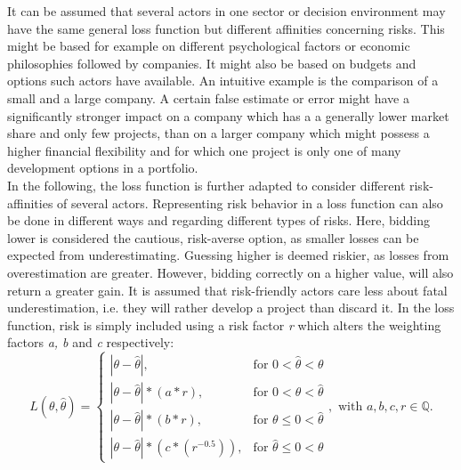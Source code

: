 		It can be assumed that several actors in one sector or decision environment may have the same general loss function but different affinities concerning risks. This might be based for example on different psychological factors or economic philosophies followed by companies. It might also be based on budgets and options such actors have available. An intuitive example is the comparison of a small and a large company. A certain false estimate or error might have a significantly stronger impact on a company which has a a generally lower market share and only few projects, than on a larger company which might possess a higher financial flexibility and for which one project is only one of many development options in a portfolio.\\		
		In the following, the loss function is further adapted to consider different risk-affinities of several actors. Representing risk behavior in a loss function can also be done in different ways and regarding different types of risks. Here, bidding lower is considered the cautious, risk-averse option, as smaller losses can be expected from underestimating. Guessing higher is deemed riskier, as losses from overestimation are greater. However, bidding correctly on a higher value, will also return a greater gain. It is assumed that risk-friendly actors care less about fatal underestimation, i.e. they will rather develop a project than discard it. In the loss function, risk is simply included using a risk factor \textit{r} which alters the weighting factors \textit{a, b} and \textit{c} respectively:
		\begin{equation}\label{eq:LFR_final}
		L(\theta,\hat{\theta}) =
		\begin{cases}
		|\theta - \hat{\theta}|, & \text{for } 0<\hat{\theta}<\theta  \\
		|\theta-\hat{\theta}|*(a*r), & \text{for } 0<\theta<\hat{\theta} \\
		|\theta-\hat{\theta}|*(b*r), & \text{for } \theta\leq0<\hat{\theta} \\
		|\theta-\hat{\theta}|*(c*(r^{-0.5})), & \text{for } \hat{\theta}\leq0<\theta 
		\end{cases},
		\text{ with } a,b,c,r \in \mathbb{Q}.
		\end{equation}	
